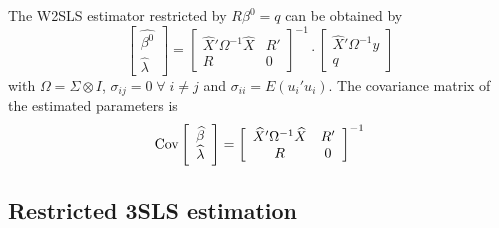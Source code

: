 The W2SLS estimator restricted by $R \beta^0 = q$ can be obtained by
\begin{equation}
   \left[ \begin{array}{c}
      \widehat{\beta^0} \\ \widehat{\lambda}
   \end{array} \right]
   =
   \left[ \begin{array}{cc}
      \widehat{X}' \Omega^{-1} \widehat{X} & R' \\ 
      R & 0
   \end{array} \right]^{-1}
   \cdot
   \left[ \begin{array}{c}
      \widehat{X}' \Omega^{-1} y \\ q 
   \end{array} \right]
\end{equation}
with $\Omega = \Sigma \otimes I$, 
$\sigma_{ij} = 0 \; \forall \; i \neq j$ and
$\sigma_{ii} = E \left( u_i' u_i \right)$.
The covariance matrix of the estimated parameters is
\begin{equation}
   \text{Cov} 
   \left[ \begin{array}{c}
      \widehat{\beta} \\ \widehat{\lambda}
   \end{array} \right] 
   = 
   \left[ \begin{array}{cc}
      \widehat{X}' \Omega^{-1} \widehat{X} & R' \\ 
      R & 0
   \end{array} \right]^{-1}
\end{equation}


\subsection{Restricted 3SLS estimation}
\label{sec:3slsR}

